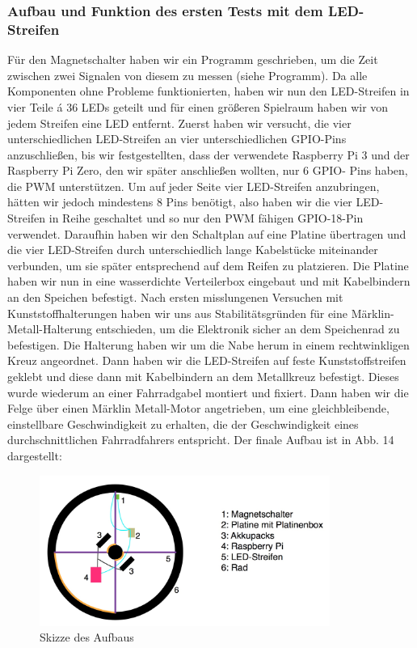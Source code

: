 \documentclass [a4paper, 11pt] {article}
\begin{document}
\subsubsection{Aufbau und Funktion des ersten Tests mit dem LED-Streifen}
Für den Magnetschalter haben wir ein Programm geschrieben, um die Zeit zwischen zwei Signalen von diesem zu messen (siehe Programm).
Da alle Komponenten ohne Probleme funktionierten, haben wir nun den LED-Streifen in vier Teile á 36 LEDs geteilt und für einen größeren Spielraum haben wir von jedem Streifen eine LED entfernt. Zuerst haben wir versucht, die vier unterschiedlichen LED-Streifen an vier unterschiedlichen GPIO-Pins anzuschließen, bis wir festgestellten, dass der verwendete Raspberry Pi 3 und der Raspberry Pi Zero, den wir später anschließen wollten, nur 6 GPIO- Pins haben, die PWM unterstützen. Um auf jeder Seite vier LED-Streifen anzubringen, hätten wir jedoch mindestens 8 Pins benötigt, also haben wir die vier LED-Streifen in Reihe geschaltet und so nur den PWM fähigen GPIO-18-Pin verwendet.
Daraufhin haben wir den Schaltplan auf eine Platine übertragen und die vier LED-Streifen durch unterschiedlich lange Kabelstücke miteinander verbunden, um sie später entsprechend auf dem Reifen zu platzieren. Die Platine haben wir nun in eine wasserdichte Verteilerbox eingebaut und mit Kabelbindern an den Speichen befestigt.
Nach ersten misslungenen Versuchen mit Kunststoffhalterungen haben wir uns aus Stabilitätsgründen für eine Märklin-Metall-Halterung entschieden, um die Elektronik sicher an dem Speichenrad zu befestigen. Die Halterung haben wir um die Nabe herum in einem rechtwinkligen Kreuz angeordnet. Dann haben wir die LED-Streifen auf feste Kunststoffstreifen geklebt und diese dann mit Kabelbindern an dem Metallkreuz befestigt. Dieses wurde wiederum an einer Fahrradgabel montiert und fixiert. Dann haben wir die Felge über einen Märklin Metall-Motor angetrieben, um eine gleichbleibende, einstellbare Geschwindigkeit zu erhalten, die der Geschwindigkeit eines durchschnittlichen Fahrradfahrers entspricht. Der finale Aufbau ist in Abb. 14 dargestellt:
\begin{figure}[h]
	\centering
	\includegraphics[width=9.5cm]{Rad.png}
	\caption{Skizze des Aufbaus}
\end{figure}
\end{document}
